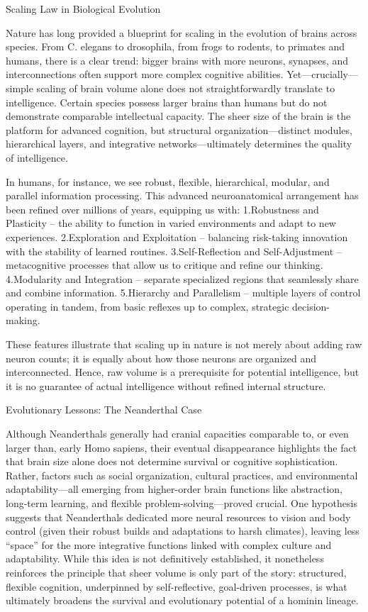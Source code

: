 Scaling Law in Biological Evolution

Nature has long provided a blueprint for scaling in the evolution of brains across species. From C. elegans to drosophila, from frogs to rodents, to primates and humans, there is a clear trend: bigger brains with more neurons, synapses, and interconnections often support more complex cognitive abilities. Yet—crucially—simple scaling of brain volume alone does not straightforwardly translate to intelligence. Certain species possess larger brains than humans but do not demonstrate comparable intellectual capacity. The sheer size of the brain is the platform for advanced cognition, but structural organization—distinct modules, hierarchical layers, and integrative networks—ultimately determines the quality of intelligence.

In humans, for instance, we see robust, flexible, hierarchical, modular, and parallel information processing. This advanced neuroanatomical arrangement has been refined over millions of years, equipping us with:
1.Robustness and Plasticity – the ability to function in varied environments and adapt to new experiences.
2.Exploration and Exploitation – balancing risk-taking innovation with the stability of learned routines.
3.Self-Reflection and Self-Adjustment – metacognitive processes that allow us to critique and refine our thinking.
4.Modularity and Integration – separate specialized regions that seamlessly share and combine information.
5.Hierarchy and Parallelism – multiple layers of control operating in tandem, from basic reflexes up to complex, strategic decision-making.

These features illustrate that scaling up in nature is not merely about adding raw neuron counts; it is equally about how those neurons are organized and interconnected. Hence, raw volume is a prerequisite for potential intelligence, but it is no guarantee of actual intelligence without refined internal structure.

Evolutionary Lessons: The Neanderthal Case

Although Neanderthals generally had cranial capacities comparable to, or even larger than, early Homo sapiens, their eventual disappearance highlights the fact that brain size alone does not determine survival or cognitive sophistication. Rather, factors such as social organization, cultural practices, and environmental adaptability—all emerging from higher-order brain functions like abstraction, long-term learning, and flexible problem-solving—proved crucial. One hypothesis suggests that Neanderthals dedicated more neural resources to vision and body control (given their robust builds and adaptations to harsh climates), leaving less “space” for the more integrative functions linked with complex culture and adaptability. While this idea is not definitively established, it nonetheless reinforces the principle that sheer volume is only part of the story: structured, flexible cognition, underpinned by self-reflective, goal-driven processes, is what ultimately broadens the survival and evolutionary potential of a hominin lineage.

